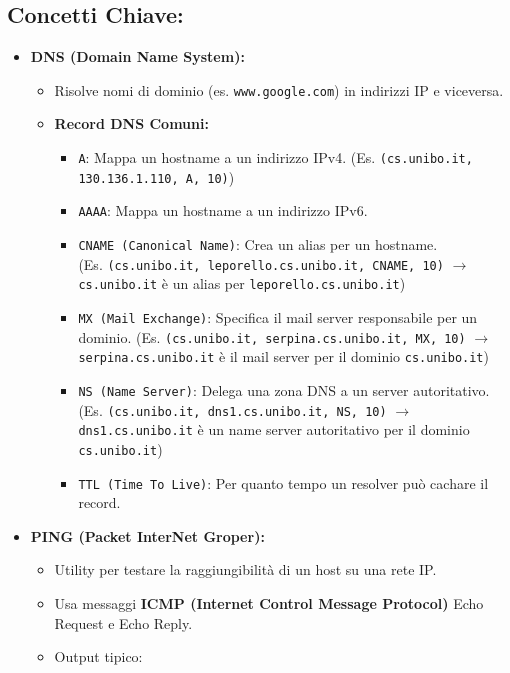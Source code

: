 \subsection{Concetti Chiave:}
\begin{itemize}
    \item \textbf{DNS (Domain Name System):}
    \begin{itemize}
        \item Risolve nomi di dominio (es. \texttt{www.google.com}) in indirizzi IP e viceversa.
        \item \textbf{Record DNS Comuni:}
        \begin{itemize}
            \item \texttt{A}: Mappa un hostname a un indirizzo IPv4. (Es. \texttt{(cs.unibo.it, 130.136.1.110, A, 10)})
            \item \texttt{AAAA}: Mappa un hostname a un indirizzo IPv6.
            \item \texttt{CNAME (Canonical Name)}: Crea un alias per un hostname.\\
            (Es. \texttt{(cs.unibo.it, leporello.cs.unibo.it, CNAME, 10)} $\to$ \texttt{cs.unibo.it} è un alias per \texttt{leporello.cs.unibo.it})
            \item \texttt{MX (Mail Exchange)}: Specifica il mail server responsabile per un dominio. (Es. \texttt{(cs.unibo.it, serpina.cs.unibo.it, MX, 10)} $\to$ \texttt{serpina.cs.unibo.it} è il mail server per il dominio \texttt{cs.unibo.it})
            \item \texttt{NS (Name Server)}: Delega una zona DNS a un server autoritativo. (Es. \texttt{(cs.unibo.it, dns1.cs.unibo.it, NS, 10)} $\to$ \texttt{dns1.cs.unibo.it} è un name server autoritativo per il dominio \texttt{cs.unibo.it})
            \item \texttt{TTL (Time To Live)}: Per quanto tempo un resolver può cachare il record.
        \end{itemize}
    \end{itemize}
    \item \textbf{PING (Packet InterNet Groper):}
    \begin{itemize}
        \item Utility per testare la raggiungibilità di un host su una rete IP.
        \item Usa messaggi \textbf{ICMP (Internet Control Message Protocol)} Echo Request e Echo Reply.
        \item Output tipico:
        \begin{itemize}

\end{itemize}
\end{itemize}
\end{itemize}
